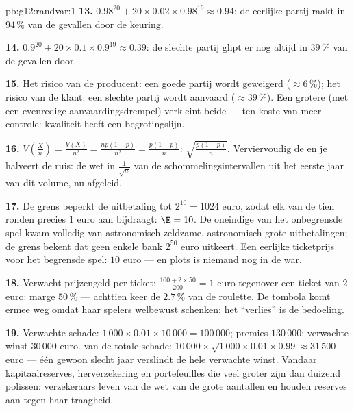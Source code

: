 \begin{solution}{pb:g12:randvar:1}
\textbf{13.} $0.98^{20} + 20 \times 0.02 \times 0.98^{19} \approx 0.94$: de
eerlijke partij raakt in $94\,\%$ van de gevallen door de keuring.

\textbf{14.} $0.9^{20} + 20 \times 0.1 \times 0.9^{19} \approx 0.39$: de
slechte partij glipt er nog altijd in $39\,\%$ van de gevallen door.

\textbf{15.} Het risico van de producent: een goede partij wordt geweigerd
($\approx 6\,\%$); het risico van de klant: een slechte partij wordt aanvaard
($\approx 39\,\%$). Een grotere  (met een evenredige
aanvaardingsdrempel) verkleint beide --- ten koste van meer controle:
kwaliteit heeft een begrotingslijn.

\textbf{16.} $V\!\left(\frac Xn\right) = \frac{V(X)}{n^2} =
\frac{np(1-p)}{n^2} = \frac{p(1-p)}{n}$: 
$\sqrt{\frac{p(1-p)}{n}}$. Verviervoudig de  en je halveert de ruis:
de wet in $\frac{1}{\sqrt n}$ van de schommelingsintervallen uit het eerste
jaar van dit volume, nu afgeleid.

\textbf{17.} De grens beperkt de uitbetaling tot $2^{10} = 1024$ euro, zodat
elk van de tien ronden precies $1$ euro aan  bijdraagt:
$\E = 10$. De oneindige  van het onbegrensde spel kwam
volledig van astronomisch zeldzame, astronomisch grote uitbetalingen; de grens
bekent dat geen enkele bank $2^{50}$ euro uitkeert. Een eerlijke ticketprijs
voor het begrensde spel: $10$ euro --- en plots is niemand nog in de war.

\textbf{18.} Verwacht prijzengeld per ticket:
$\frac{100 + 2 \times 50}{200} = 1$ euro tegenover een ticket van $2$ euro:
marge $50\,\%$ --- achttien keer de $2.7\,\%$ van de roulette. De tombola komt
ermee weg omdat haar spelers welbewust schenken: het ``verlies'' is de
bedoeling.

\textbf{19.} Verwachte schade: $1\,000 \times 0.01 \times 10\,000 =
100\,000$; premies $130\,000$: verwachte winst $30\,000$ euro.
 van de totale schade:
$10\,000 \times \sqrt{1\,000 \times 0.01 \times 0.99} \approx 31\,500$ euro
--- één gewoon slecht jaar verslindt de hele verwachte winst. Vandaar
kapitaalreserves, herverzekering en portefeuilles die veel groter zijn dan
duizend polissen: verzekeraars leven van de wet van de grote aantallen en
houden reserves aan tegen haar traagheid.


\end{solution}
